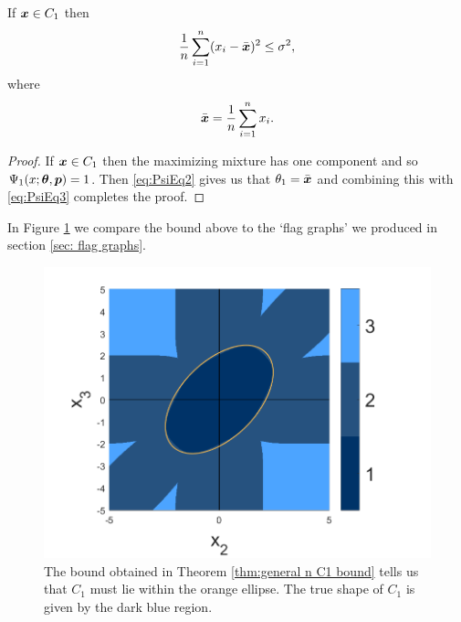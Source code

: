 	\begin{theorem}
		\label{thm:general n C1 bound}
		If ${\bm{{x}}} \in C_1$ then 
		\begin{equation}
			\frac{1}{n} \sum_{i=1}^n (x_i - \bar{{\bm{{x}}}})^2 \leq \sigma^2,
		\end{equation}
		where 
		\begin{equation}
			\bar{{\bm{{x}}}} = \frac{1}{n}\sum_{i = 1}^n x_i.
		\end{equation}
	\end{theorem}
	\begin{proof}
		If ${\bm{{x}}} \in C_1$ then the maximizing mixture has one component and so $\Psi_1(x; {\bm{{\theta}}}, {\bm{{p}}}) = 1$. Then \eqref{eq:PsiEq2} gives us that $\theta_1 = \bar{{\bm{{x}}}}$ and combining this with \eqref{eq:PsiEq3} completes the proof.
	\end{proof}
	In Figure \ref{fig:flag graph m1 bound} we compare the bound above to the `flag graphs' we produced in section \ref{sec: flag graphs}.

	\begin{figure}
		\centering
		\includegraphics[width = \textwidth]{Figures/Mixtures/normal_flag_graph_m1_bound.png}
		\caption{The bound obtained in Theorem \ref{thm:general n C1 bound} tells us that $C_1$ must lie within the orange ellipse. The true shape of $C_1$ is given by the dark blue region.}
		\label{fig:flag graph m1 bound}
	\end{figure}


